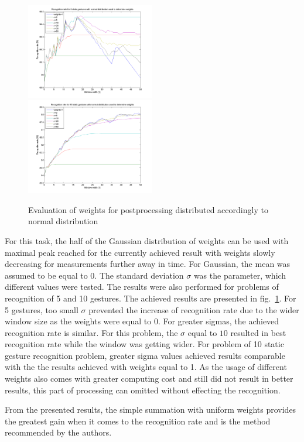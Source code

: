 \begin{figure}[htb]
\centering

\centerline{%
 \includegraphics[width=0.5\textwidth]{figures/gaussSum5.png}
 \includegraphics[width=0.5\textwidth]{figures/gaussSum10.png}
 }%
 \caption{Evaluation of weights for postprocessing distributed accordingly to normal distribution}
 \label{staticgauss}
\end{figure}

For this task, the half of the Gaussian distribution of weights can be used with maximal peak reached for the currently achieved result with weights slowly decreasing for measurements further away in time.
For Gaussian, the mean was assumed to be equal to $0$.
The standard deviation $\sigma$ was the parameter, which different values were tested.
The results were also performed for problems of recognition of 5 and 10 gestures.
The achieved results are presented in fig.~\ref{staticgauss}.
For 5 gestures, too small $\sigma$ prevented the increase of recognition rate due to the wider window size as the weights were equal to $0$. 
For greater sigmas, the achieved recognition rate is similar.
For this problem, the $\sigma$ equal to $10$ resulted in best recognition rate while the window was getting wider.
For problem of 10 static gesture recognition problem, greater sigma values achieved results comparable with the the results achieved with weights equal to 1.
As the usage of different weights also comes with greater computing cost and still did not result in better results, this part of processing can omitted without effecting the recognition.


From the presented results, the simple summation with uniform weights provides the greatest gain when it comes to the recognition rate and is the method recommended by the authors. 
